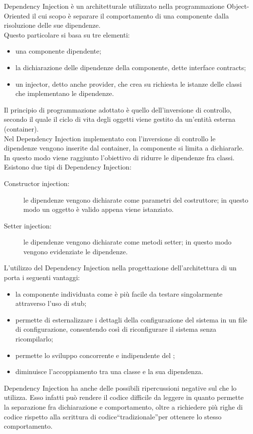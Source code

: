 	 \label{app:dependencyinjection}
	Dependency Injection è un  architetturale utilizzato nella programmazione Object-Oriented il cui scopo è separare il comportamento di una componente dalla risoluzione delle sue dipendenze. \\
	Questo particolare  si basa su tre elementi:
	\begin{itemize}
		\item una componente dipendente;
		\item la dichiarazione delle dipendenze della componente, dette interface contracts;
		\item un injector, detto anche provider, che crea su richiesta le istanze delle classi che implementano le dipendenze.
	\end{itemize}
	Il principio di programmazione adottato è quello dell'inversione di controllo, secondo il quale il ciclo di vita degli oggetti viene gestito da un'entità esterna (container).\\
	Nel Dependency Injection implementato con l'inversione di controllo le dipendenze vengono inserite dal container, la componente si limita a dichiararle. In questo modo viene raggiunto l'obiettivo di ridurre le dipendenze fra classi.\\
	Esistono due tipi di Dependency Injection:
	\begin{description}
		\item[Constructor injection:] le dipendenze vengono dichiarate come parametri del costruttore; in questo modo un oggetto è valido appena viene istanziato.
		\item[Setter injection:] le dipendenze vengono dichiarate come metodi setter; in questo modo vengono evidenziate le dipendenze.
	\end{description}
		L'utilizzo del  Dependency Injection nella progettazione dell'architettura di un  porta i seguenti vantaggi:
		\begin{itemize}
			\item la componente individuata come  è più facile da testare singolarmente attraverso l'uso di stub;
			\item permette di esternalizzare i dettagli della configurazione del sistema in un file di configurazione, consentendo così di riconfigurare il sistema senza ricompilarlo;
			\item permette lo sviluppo concorrente e indipendente del ;
			\item diminuisce l'accoppiamento tra una classe e la sua dipendenza.
			\end{itemize}
		Dependency Injection ha anche delle possibili ripercussioni negative sul  che lo utilizza. Esso infatti può rendere il codice difficile da leggere in quanto permette la separazione fra dichiarazione e comportamento, oltre a richiedere più righe di codice rispetto alla scrittura di codice“tradizionale”per ottenere lo stesso comportamento.

